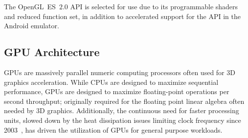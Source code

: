 The OpenGL~ES~$2.0$ API is selected for use due to its programmable shaders and reduced function set, in addition to accelerated support for the API in the Android emulator.



\subsection{GPU Architecture}
\label{sec:backgroundandrelatedwork_gpuarchitecture}
GPUs are massively parallel numeric computing processors often used for 3D graphics acceleration.
While CPUs are designed to maximize sequential performance, GPUs are designed to maximize floating-point operations per second throughput; originally required for the floating point linear algebra often needed by 3D graphics.
Additionally, the continuous need for faster processing units, slowed down by the heat dissipation issues limiting clock frequency since 2003~, has driven the utilization of GPUs for general purpose workloads.

